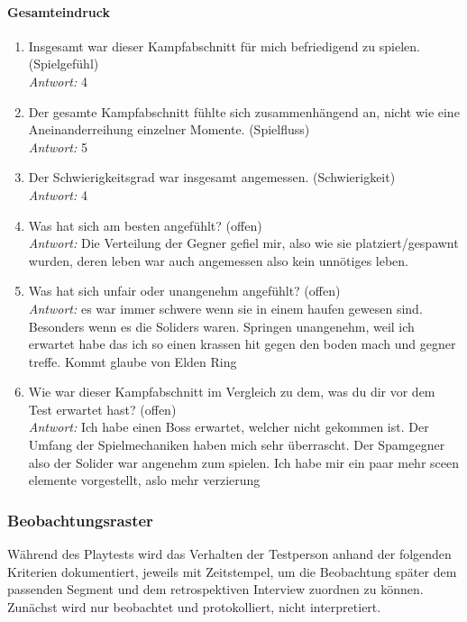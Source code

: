 \documentclass[../Main.tex]{subfiles}
\begin{document}
\paragraph{Gesamteindruck}
\begin{enumerate}[label=\textbf{Q\arabic*}, leftmargin=1.5cm, itemsep=0.8em, resume]
    \item Insgesamt war dieser Kampfabschnitt für mich befriedigend zu spielen. \hfill (Spielgefühl) \\
    \textit{Antwort:} 4
    \item Der gesamte Kampfabschnitt fühlte sich zusammenhängend an, nicht wie eine Aneinanderreihung einzelner Momente. \hfill (Spielfluss) \\
    \textit{Antwort:} 5
    \item Der Schwierigkeitsgrad war insgesamt angemessen. \hfill (Schwierigkeit) \\
    \textit{Antwort:} 4
    \item Was hat sich am besten angefühlt? \hfill (offen) \\
    \textit{Antwort:} Die Verteilung der Gegner gefiel mir, also wie sie platziert/gespawnt wurden, deren leben war auch angemessen also kein unnötiges leben.
    \item Was hat sich unfair oder unangenehm angefühlt? \hfill (offen) \\
    \textit{Antwort:} es war immer schwere wenn sie in einem haufen gewesen sind. Besonders wenn es die Soliders waren. Springen unangenehm, weil ich erwartet habe das ich so einen krassen hit gegen den boden mach und gegner treffe. Kommt glaube von Elden Ring
    \item Wie war dieser Kampfabschnitt im Vergleich zu dem, was du dir vor dem Test erwartet hast? \hfill (offen) \\
    \textit{Antwort:} Ich habe einen Boss erwartet, welcher nicht gekommen ist. Der Umfang der Spielmechaniken haben mich sehr überrascht. Der Spamgegner also der Solider war angenehm zum spielen. Ich habe mir ein paar mehr sceen elemente vorgestellt, aslo mehr verzierung
\end{enumerate}

\subsubsection{Beobachtungsraster}

Während des Playtests wird das Verhalten der Testperson anhand der folgenden Kriterien dokumentiert, jeweils mit Zeitstempel, um die Beobachtung später dem passenden Segment und dem retrospektiven Interview zuordnen zu können. Zunächst wird nur beobachtet und protokolliert, nicht interpretiert.
\end{document}
